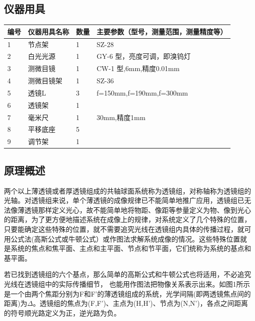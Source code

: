 \documentclass[dvipsnames, svgnames,a4paper,11pt]{article}
\begin{document}
	\subsection{仪器用具}
	\begin{table}[htbp]
		\centering
		\renewcommand\arraystretch{1.6}
		\begin{tabular}{p{}|p{}|p{}|p{}}
			\hline
			编号& 仪器用具名称 & 数量 &  主要参数（型号，测量范围，测量精度等） \\
			\hline
			1& 节点架 &1 & SZ-28 \\
			
			2& 白光光源 &1 & GY-6 型，亮度可调，即溴钨灯 \\
			
			3& 测微目镜 & 1 & CW-1 型,6mm,精度0.01mm \\
			
			4& 测微目镜架 & 1 & SZ-36 \\
			
			5& 透镜L & 3 & f=150mm,f=190mm,f=300mm  \\
			
			6& 透镜架 & 1 & \\
			
			7& 毫米尺 & 1 & 30mm,精度1mm \\
			
			8& 平移底座 & 5 & \\
			
			9& 调节架 & 1 & \\
			\hline
		\end{tabular}
	\end{table}
	
	\subsection{原理概述}
	两个以上薄透镜或者厚透镜组成的共轴球面系统称为透镜组，对称轴称为透镜组的光轴。对透镜组来说，单个薄透镜的成像规律已不能简单地推广应用，透镜组已无法像薄透镜那样定义光心，故不能简单地将物距、像距等参量定义为物、像到光心的距离，为了更方便地描述系统在成像上的规律，对系统定义了几个特殊的位置，只要能确定这些特殊的位置，就不需要追究光线在透镜组内具体的传播过程，就可用公式法(高斯公式或牛顿公式）或作图法求解系统成像的情况。这些特殊位置就是系统的焦点和焦平面、主点和主平面、节点和节平面，它们统称为系统的基点和基平面。
	
	若已找到透镜组的六个基点，那么简单的高斯公式和牛顿公式也将适用，不必追究光线在透镜组中的实际传播细节，
	也能用作图法把物像关系表示出来。如图1所示是一个由两个焦距分别为F和F'的薄透镜组成的系统，光学间隔(即两透镜焦点间的距离)为$\Delta$。透镜组的焦点为(F,F')、主点为(H,H')、节点为(N,N')，各点之间距离的符号顺光路定义为正，逆光路为负。
	
\end{document}
